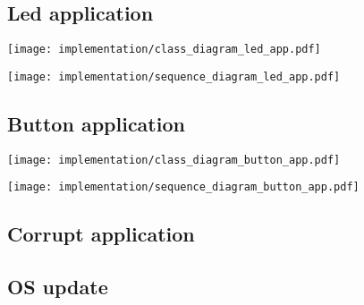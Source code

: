 \subsection{Led application}
\begin{center}
    \begingroup
    \texttt{[image: implementation/class\_diagram\_led\_app.pdf]}
    \label{fig:class_diagram_led_app}
    \endgroup
\end{center}

\begin{center}
    \begingroup
    \texttt{[image: implementation/sequence\_diagram\_led\_app.pdf]}
    \label{fig:sequence_diagram_led_app}
    \endgroup
\end{center}

\subsection{Button application}
\begin{center}
    \begingroup
    \texttt{[image: implementation/class\_diagram\_button\_app.pdf]}
    \label{fig:class_diagram_button_app}
    \endgroup
\end{center}

\begin{center}
    \begingroup
    \texttt{[image: implementation/sequence\_diagram\_button\_app.pdf]}
    \label{fig:sequence_diagram_button_app}
    \endgroup
\end{center}

\subsection{Corrupt application}

\subsection{OS update}
